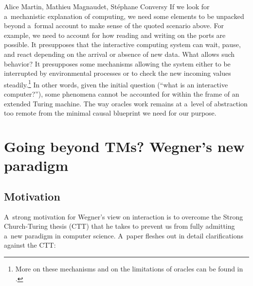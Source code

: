 \begin{artengenv2auth}{Alice Martin, Mathieu Magnaudet, Stéphane Conversy}
If we look for a~mechanistic explanation of computing, we need some elements to be unpacked beyond a~formal account to make sense of the quoted scenario above. For example, we need to account for how reading and writing on the ports are possible. It presupposes that the interactive computing system can wait, pause, and react depending on the arrival or absence of new data. What allows such behavior? It presupposes some mechanisms allowing the system either to be interrupted by environmental processes or to check the new incoming values steadily.\footnote{More on these mechanisms and on the limitations of oracles can be found in \parencite{Martin2023}.} 
In other words, given the initial question (``what is an interactive computer?''), some phenomena cannot be accounted for within the frame of an extended Turing machine. The way oracles work remains at a~level of abstraction too remote from the minimal causal blueprint we need for our purpose.

\section{Going beyond TMs? Wegner’s new paradigm}
\label{Wegner}
\subsection{Motivation}

A~strong motivation for Wegner’s view on interaction is to overcome the Strong Church-Turing thesis (CTT) that he takes to prevent us from fully admitting a~new paradigm in computer science. A~paper fleshes out in detail clarifications against the CTT: 



\end{artengenv2auth}
